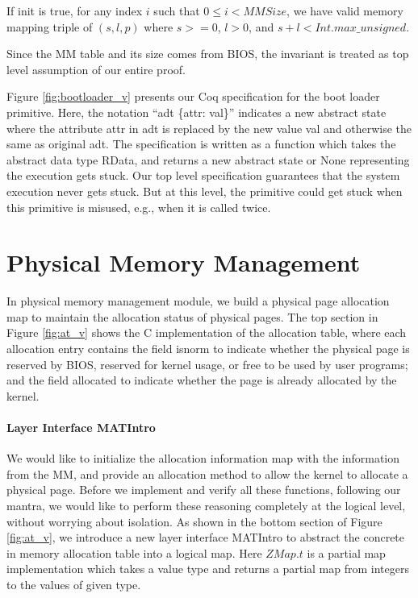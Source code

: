 \begin{invariant}[MM valid]
If \textsf{init} is \textsf{true}, for any index $i$ such that $0\le i<MMSize$, we have valid memory mapping
triple of $(s, l, p)$ where $s >= 0$, $l > 0$, and $s + l < Int.max\_unsigned$.
\end{invariant}

Since the MM table and its size comes from BIOS, the invariant is treated as top level
assumption of our entire proof. 

Figure \ref{fig:bootloader_v} presents our Coq specification for the boot loader primitive.
Here, the notation ``\textsf{adt \{attr: val\}}'' indicates a new abstract state where the attribute
\textsf{attr} in \textsf{adt} is replaced by the new value \textsf{val} and otherwise the same
as original \textsf{adt}.
The specification is written as a function which takes the abstract data type \textsf{RData},
and returns a new abstract state or \textsf{None} representing the execution gets stuck.
Our top level specification guarantees that the system execution never gets stuck.
But at this level, the primitive could get stuck when this primitive is misused, e.g., when it is called twice.


\section{Physical Memory Management}

In physical memory management module, we build a physical page allocation map to maintain the
allocation status of physical pages.
The top section in Figure \ref{fig:at_v} shows
the C implementation of the allocation table, where each allocation entry contains the field \textsf{isnorm}
to indicate whether the
physical page is reserved by BIOS, reserved for kernel usage, or free to be used by user programs;
and the field \textsf{allocated} to indicate whether the page is already allocated by the kernel.

\paragraph{Layer Interface MATIntro}
We would like to initialize the allocation information map with the information from the \textsf{MM},
and provide an allocation method to allow the kernel to allocate a physical page.
Before we implement and verify all these functions, following our mantra, we would like to perform
these reasoning completely at the logical level, without worrying about isolation.
As shown in the bottom section of Figure \ref{fig:at_v}, we introduce a new layer interface MATIntro
to abstract the concrete in memory allocation table into a logical map. Here $ZMap.t$ is a partial
map implementation which takes a value type and returns a partial map from integers to the values of given type.


